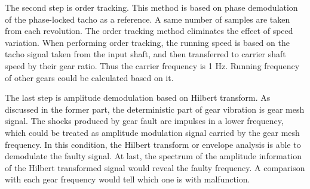 The second step is order tracking. This method is based on phase demodulation of the phase-locked tacho as a reference. A same number of samples are taken from each revolution. The order tracking method eliminates the effect of speed variation. When performing order tracking, the running speed is based on the tacho signal taken from the input shaft, and then transferred to carrier shaft speed by their gear ratio. Thus the carrier frequency is 1 Hz. Running frequency of other gears could be calculated based on it.

The last step is amplitude demodulation based on Hilbert transform. As discussed in the former part, the deterministic part of gear vibration is gear mesh signal. The shocks produced by gear fault are impulses in a lower frequency, which could be treated as amplitude modulation signal carried by the gear mesh frequency. In this condition, the Hilbert transform or envelope analysis is able to demodulate the faulty signal. At last, the spectrum of the amplitude information of the Hilbert transformed signal would reveal the faulty frequency. A comparison with each gear frequency would tell which one is with malfunction. 












